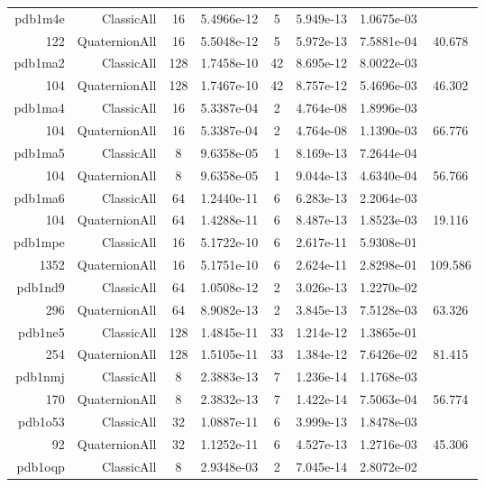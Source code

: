 \begin{xltabular}{\textwidth}{r|rcS[table-format=1.4e+2]cS[table-format=1.3e+2]S[table-format=1.4e+2]S[table-format=-1.3]}
pdb1m4e & ClassicAll & 16 & 5.4966e-12 & 5 & 5.949e-13 & 1.0675e-03 & \\
122 & QuaternionAll & 16 & 5.5048e-12 & 5 & 5.972e-13 & 7.5881e-04 & 40.678\\  \addlinespace
pdb1ma2 & ClassicAll & 128 & 1.7458e-10 & 42 & 8.695e-12 & 8.0022e-03 & \\
104 & QuaternionAll & 128 & 1.7467e-10 & 42 & 8.757e-12 & 5.4696e-03 & 46.302\\  \addlinespace
pdb1ma4 & ClassicAll & 16 & 5.3387e-04 & 2 & 4.764e-08 & 1.8996e-03 & \\
104 & QuaternionAll & 16 & 5.3387e-04 & 2 & 4.764e-08 & 1.1390e-03 & 66.776\\  \addlinespace
pdb1ma5 & ClassicAll & 8 & 9.6358e-05 & 1 & 8.169e-13 & 7.2644e-04 & \\
104 & QuaternionAll & 8 & 9.6358e-05 & 1 & 9.044e-13 & 4.6340e-04 & 56.766\\  \addlinespace
pdb1ma6 & ClassicAll & 64 & 1.2440e-11 & 6 & 6.283e-13 & 2.2064e-03 & \\
104 & QuaternionAll & 64 & 1.4288e-11 & 6 & 8.487e-13 & 1.8523e-03 & 19.116\\  \addlinespace
pdb1mpe & ClassicAll & 16 & 5.1722e-10 & 6 & 2.617e-11 & 5.9308e-01 & \\
1352 & QuaternionAll & 16 & 5.1751e-10 & 6 & 2.624e-11 & 2.8298e-01 & 109.586\\  \addlinespace
pdb1nd9 & ClassicAll & 64 & 1.0508e-12 & 2 & 3.026e-13 & 1.2270e-02 & \\
296 & QuaternionAll & 64 & 8.9082e-13 & 2 & 3.845e-13 & 7.5128e-03 & 63.326\\  \addlinespace
pdb1ne5 & ClassicAll & 128 & 1.4845e-11 & 33 & 1.214e-12 & 1.3865e-01 & \\
254 & QuaternionAll & 128 & 1.5105e-11 & 33 & 1.384e-12 & 7.6426e-02 & 81.415\\  \addlinespace
pdb1nmj & ClassicAll & 8 & 2.3883e-13 & 7 & 1.236e-14 & 1.1768e-03 & \\
170 & QuaternionAll & 8 & 2.3832e-13 & 7 & 1.422e-14 & 7.5063e-04 & 56.774\\  \addlinespace
pdb1o53 & ClassicAll & 32 & 1.0887e-11 & 6 & 3.999e-13 & 1.8478e-03 & \\
92 & QuaternionAll & 32 & 1.1252e-11 & 6 & 4.527e-13 & 1.2716e-03 & 45.306\\  \addlinespace
pdb1oqp & ClassicAll & 8 & 2.9348e-03 & 2 & 7.045e-14 & 2.8072e-02 & \\

\end{xltabular}
